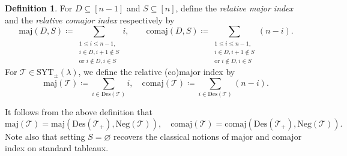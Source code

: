 \documentclass[11pt]{article}
\theoremstyle{definition}
\newtheorem{defi}[theo]{Definition}
\numberwithin{equation}{section}
\newcommand\comaj{\mathrm{comaj}}
\newcommand\Des{\mathrm{Des}}
\newcommand\maj{\mathrm{maj}}
\newcommand\Neg{\mathrm{Neg}}
\newcommand\SYT{\mathrm{SYT}}
\begin{document}
\begin{defi}\label{def:super-maj}
For $D \subseteq [n-1]$ and $S \subseteq [n]$, define the \emph{relative major index} and the \emph{relative comajor index} respectively by
\[
\maj(D,S) \coloneqq \sum_{\substack{1 \le i \le n-1, \\ i \in D, i+1 \not\in S \\ \text{or } i \not\in D, i \in S}} i, \qquad \comaj(D,S) \coloneqq \sum_{\substack{1 \le i \le n-1, \\ i \in D, i+1 \not\in S \\ \text{or } i \not\in D, i \in S}} (n-i).
\]
For $\mathcal{T} \in \SYT_\pm(\lambda)$, we define the relative (co)major index by
\[
\maj(\mathcal{T}) \coloneqq \sum_{i \in \Des(\mathcal{T})} i, \quad \comaj(\mathcal{T}) \coloneqq \sum_{i \in \Des(\mathcal{T})} (n-i).
\]
\end{defi}
It follows from the above definition that
\[
\maj(\mathcal{T}) = \maj(\Des(\mathcal{T}_+),\Neg(\mathcal{T})), \quad \comaj(\mathcal{T}) = \comaj(\Des(\mathcal{T}_+),\Neg(\mathcal{T})).
\]
Note also that setting $S = \varnothing$ recovers the classical notions of major and comajor index on standard tableaux.
\end{document}

